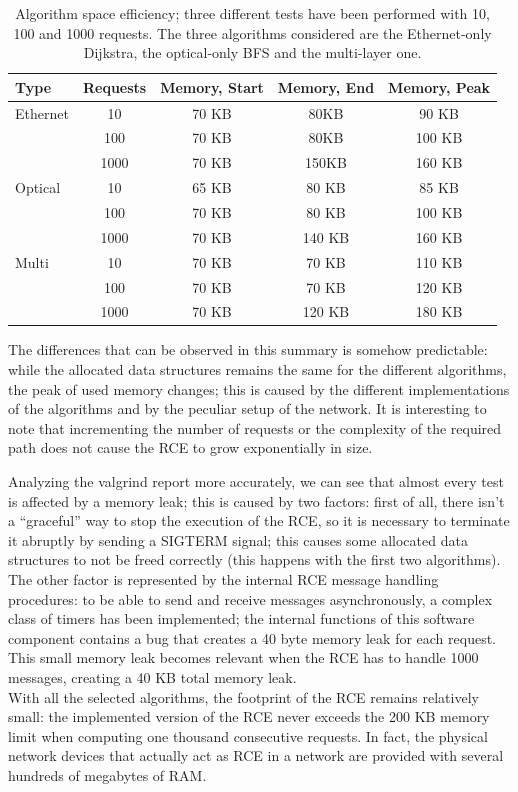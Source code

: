 \documentclass[10pt,a4paper]{report}
\begin{document}
\begin{table}[!htbp]
  \begin{center}
    \begin{tabular}{|l|c|c|c|c|}
      \hline
      \textbf{Type} & \textbf{Requests} & \textbf{Memory, Start}
      & \textbf{Memory, End} & \textbf{Memory, Peak} \\ \hline
      Ethernet & 10 & 70 KB & 80KB & 90 KB \\
      & 100 & 70 KB & 80KB & 100 KB \\
      & 1000 & 70 KB & 150KB & 160 KB \\ \hline
      Optical & 10 & 65 KB & 80 KB & 85 KB \\
      & 100 & 70 KB & 80 KB & 100 KB \\
      & 1000 & 70 KB & 140 KB & 160 KB \\ \hline
      Multi & 10 & 70 KB & 70 KB & 110 KB \\
      & 100 & 70 KB & 70 KB & 120 KB \\
      & 1000 & 70 KB & 120 KB & 180 KB \\
      \hline
    \end{tabular}
    \caption[Algorithm space efficiency]{Algorithm space efficiency;
      three different tests have been performed with 10, 100 and 1000
      requests. The three algorithms considered are the Ethernet-only
      Dijkstra, the optical-only BFS and the multi-layer one.}
    \label{tab:test_eth}
  \end{center}
\end{table}

The differences that can be observed in this summary is somehow
predictable: while the allocated data structures remains the same for
the different algorithms, the peak of used memory changes; this is
caused by the different implementations of the algorithms and by the
peculiar setup of the network. It is interesting to note that
incrementing the number of requests or the complexity of the required
path does not cause the RCE to grow exponentially in size.

Analyzing the valgrind report more accurately, we can see that almost
every test is affected by a memory leak; this is caused by two
factors: first of all, there isn't a ``graceful'' way to stop the
execution of the RCE, so it is necessary to terminate it abruptly by
sending a SIGTERM signal; this causes some allocated data structures
to not be freed correctly (this happens with the first two
algorithms). The other factor is represented by the internal RCE
message handling procedures: to be able to send and receive messages
asynchronously, a complex class of timers has been implemented; the
internal functions of this software component contains a bug that
creates a 40 byte memory leak for each request. This small memory leak
becomes relevant when the RCE has to handle 1000 messages, creating a
40 KB total memory leak. \\
With all the selected algorithms, the footprint of the RCE remains
relatively small: the implemented version of the RCE never exceeds the
200 KB memory limit when computing one thousand consecutive
requests. In fact, the physical network devices that actually act as
RCE in a network are provided with several hundreds of megabytes of
RAM.
\end{document}
